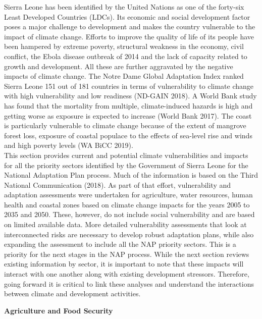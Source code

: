 \documentclass[
]{book}
\begin{document}
Sierra Leone has been identified by the United Nations as one of the forty-six Least Developed Countries (LDCs). Its economic and social development factor poses a major challenge to development and makes the country vulnerable to the impact of climate change. Efforts to improve the quality of life of its people have been hampered by extreme poverty, structural weakness in the economy, civil conflict, the Ebola disease outbreak of 2014 and the lack of capacity related to growth and development. All these are further aggravated by the negative impacts of climate change. The Notre Dame Global Adaptation Index ranked Sierra Leone 151 out of 181 countries in terms of vulnerability to climate change with high vulnerability and low readiness (ND-GAIN 2018). A World Bank study has found that the mortality from multiple, climate-induced hazards is high and getting worse as exposure is expected to increase (World Bank 2017). The coast is particularly vulnerable to climate change because of the extent of mangrove forest loss, exposure of coastal populace to the effects of sea-level rise and winds and high poverty levels (WA BiCC 2019).\\
This section provides current and potential climate vulnerabilities and impacts for all the priority sectors identified by the Government of Sierra Leone for the National Adaptation Plan process. Much of the information is based on the Third National Communication (2018). As part of that effort, vulnerability and adaptation assessments were undertaken for agriculture, water resources, human health and coastal zones based on climate change impacts for the years 2005 to 2035 and 2050. These, however, do not include social vulnerability and are based on limited available data. More detailed vulnerability assessments that look at interconnected risks are necessary to develop robust adaptation plans, while also expanding the assessment to include all the NAP priority sectors. This is a priority for the next stages in the NAP process. While the next section reviews existing information by sector, it is important to note that these impacts will interact with one another along with existing development stressors. Therefore, going forward it is critical to link these analyses and understand the interactions between climate and development activities.

\textbf{Agriculture and Food Security}
\end{document}
